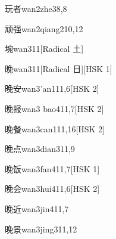 \begin{entry}{玩者}{wan2zhe3}{8,8}
\end{entry}

\begin{entry}{顽强}{wan2qiang2}{10,12}
\end{entry}

\begin{entry}{埦}{wan3}{11}[Radical 土]
\end{entry}

\begin{entry}{晚}{wan3}{11}[Radical 日][HSK 1]
\end{entry}

\begin{entry}{晚安}{wan3'an1}{11,6}[HSK 2]
\end{entry}

\begin{entry}{晚报}{wan3 bao4}{11,7}[HSK 2]
\end{entry}

\begin{entry}{晚餐}{wan3can1}{11,16}[HSK 2]
\end{entry}

\begin{entry}{晚点}{wan3dian3}{11,9}
\end{entry}

\begin{entry}{晚饭}{wan3fan4}{11,7}[HSK 1]
\end{entry}

\begin{entry}{晚会}{wan3hui4}{11,6}[HSK 2]
\end{entry}

\begin{entry}{晚近}{wan3jin4}{11,7}
\end{entry}

\begin{entry}{晚景}{wan3jing3}{11,12}
\end{entry}

